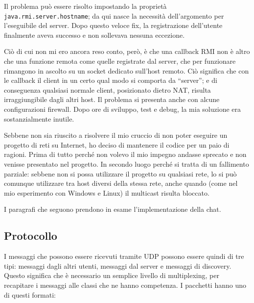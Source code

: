 \documentclass[a4paper,11pt] {article}
\begin{document}
Il problema può essere risolto impostando la proprietà \texttt{java.rmi.server.hostname}; da qui nasce la necessità dell'argomento per l'eseguibile del server. Dopo questo veloce fix, la registrazione dell'utente finalmente aveva successo e non sollevava nessuna eccezione.

Ciò di cui non mi ero ancora reso conto, però, è che una callback RMI non è altro che una funzione remota come quelle registrate dal server, che per funzionare rimangono in ascolto su un socket dedicato sull'host remoto. Ciò significa che con le callback il client in un certo qual modo si comporta da ``server''; e di conseguenza qualsiasi normale client, posizionato dietro NAT, risulta irraggiungibile dagli altri host. Il problema si presenta anche con alcune configurazioni firewall. Dopo ore di sviluppo, test e debug, la mia soluzione era sostanzialmente inutile.

Sebbene non sia riuscito a risolvere il mio cruccio di non poter eseguire un progetto di reti su Internet, ho deciso di mantenere il codice per un paio di ragioni. Prima di tutto perché non volevo il mio impegno andasse sprecato e non venisse presentato nel progetto. In secondo luogo perché si tratta di un fallimento parziale: sebbene non si possa utilizzare il progetto su qualsiasi rete, lo si può comunque utilizzare tra host diversi della stessa rete, anche quando (come nel mio esperimento con Windows e Linux) il multicast risulta bloccato.

I paragrafi che seguono prendono in esame l'implementazione della chat.

\subsection*{Protocollo}

I messaggi che possono essere ricevuti tramite UDP possono essere quindi di tre tipi: messaggi dagli altri utenti, messaggi dal server e messaggi di discovery. Questo significa che è necessario un semplice livello di multiplexing, per recapitare i messaggi alle classi che ne hanno competenza. I pacchetti hanno uno di questi formati:
\end{document}
